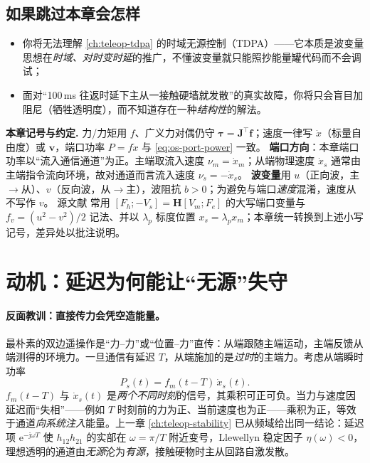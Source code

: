 \subsection*{如果跳过本章会怎样}
\begin{itemize}
  \item 你将无法理解 \cref{ch:teleop-tdpa} 的时域无源控制（TDPA）——它本质是波变量思想在\emph{时域、对时变时延}的推广，不懂波变量就只能照抄能量罐代码而不会调试；
  \item 面对“100\,ms 往返时延下主从一接触硬墙就发散”的真实故障，你将只会盲目加阻尼（牺牲透明度），而不知道存在一种\emph{结构性}的解法。
\end{itemize}

\begin{note}
\textbf{本章记号与约定.}\;
力/力矩用 $f$、广义力对偶仍守 $\boldsymbol\tau=\mathbf J^\top\mathbf f$；速度一律写 $\dot x$（标量自由度）或 $\mathbf v$，端口功率 $P=f\dot x$ 与 \cref{eq:os-port-power} 一致。
\textbf{端口方向}：本章端口功率以“流入通信通道”为正。主端取流入速度 $\nu_m=\dot x_m$；从端物理速度 $\dot x_s$ 通常由主端指令流向环境，故对通道而言流入速度 $\nu_s=-\dot x_s$。
\textbf{波变量}用 $u$（正向波，主$\to$从）、$v$（反向波，从$\to$主），波阻抗 $b>0$；为避免与端口\emph{速度}混淆，速度从不写作 $v$。
源文献 \cite{anderson1989bilateral,niemeyer1991stable} 常用 $[F_h;-V_s]=\mathbf H[V_m;F_e]$ 的大写端口变量与 $f\!_v=(u^2-v^2)/2$ 记法、并以 $\lambda_p$ 标度位置 $x_s=\lambda_p x_m$；本章统一转换到上述小写记号，差异处以批注说明。
\end{note}

\section{动机：延迟为何能让“无源”失守}
\label{sec:tw-motivation}

\paragraph{反面教训：直接传力会凭空造能量。}
最朴素的双边遥操作是“力--力”或“位置--力”直传：从端跟随主端运动，主端反馈从端测得的环境力。一旦通信有延迟 $T$，从端施加的是\emph{过时}的主端力。考虑从端瞬时功率
\begin{equation}
  P_s(t)=f_m(t-T)\,\dot x_s(t).
  \label{eq:tw-naive-power}
\end{equation}
$f_m(t-T)$ 与 $\dot x_s(t)$ 是\emph{两个不同时刻}的信号，其乘积可正可负。当力与速度因延迟而“失相”——例如 $T$ 时刻前的力为正、当前速度也为正——乘积为正，等效于通道\emph{向系统注入}能量。上一章 \cref{ch:teleop-stability} 已从频域给出同一结论：延迟项 $\mathrm e^{-\mathrm j\omega T}$ 使 $h_{12}h_{21}$ 的实部在 $\omega=\pi/T$ 附近变号，Llewellyn 稳定因子 $\eta(\omega)<0$，理想透明的通道由\emph{无源}沦为\emph{有源}，接触硬物时主从回路自激发散。

